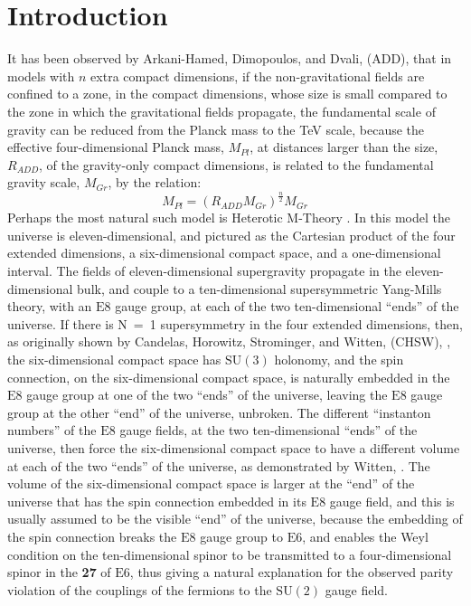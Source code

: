 \documentclass[a4paper,12pt,oneside]{article}
\begin{document}
\vspace{3.7cm}

\section{Introduction}

It has been observed by Arkani-Hamed, Dimopoulos, and Dvali, (ADD), 
\cite{ADD1, ADD2} that in models with $n$ extra compact dimensions, 
if the
non-gravitational fields are confined to a zone, in the compact
dimensions, whose size is small compared to the zone in which the
gravitational fields propagate, the fundamental scale of gravity can
be reduced from the Planck mass to the TeV scale, because the 
effective four-dimensional Planck mass, $M_{Pl}$, at distances 
larger than the size, $R_{ADD}$, of the gravity-only compact 
dimensions, is 
related to the fundamental gravity scale, $M_{Gr}$, by the relation:
\begin{equation}\label{ADD equation}
M_{Pl} = (R_{ADD}M_{Gr})^{\frac{n}{2}}M_{Gr}
\end{equation}
Perhaps the most natural such model is Heterotic M-Theory \cite{HW1,
HW2}.  In this model the universe is eleven-dimensional, and 
pictured as
the Cartesian product of the four extended dimensions, a
six-dimensional compact space, and a one-dimensional interval.  The
fields of eleven-dimensional supergravity propagate in the
eleven-dimensional bulk, and couple to a ten-dimensional
supersymmetric Yang-Mills theory, with an $\mathrm{E}8$ gauge group,
at each of the two ten-dimensional ``ends'' of the universe.  If
there is \mbox{N = 1} supersymmetry in the four extended 
dimensions, then,
as originally shown by Candelas, Horowitz, Strominger, and Witten,
(CHSW), \cite{CHSW}, the six-dimensional compact space has 
$\mathrm{SU}(3)$ holonomy, and the spin connection, on the 
six-dimensional compact space, is naturally embedded in the 
$\mathrm{E}8$ gauge group at one of the two ``ends'' of the 
universe, leaving the $\mathrm{E}8$ gauge group at the other 
``end'' of the universe, unbroken.  The different ``instanton 
numbers'' of the $\mathrm{E}8$ gauge fields, at the two 
ten-dimensional ``ends'' of the universe, then force the 
six-dimensional compact space to have a different volume at each of 
the two ``ends'' of the universe, as demonstrated by Witten,
\cite{Witten}.  The volume of the six-dimensional compact space is 
larger at the ``end'' of the universe
that has the spin connection embedded in its $\mathrm{E}8$ gauge
field, and this is usually assumed to be the visible ``end'' of the
universe, because the embedding of the spin connection breaks the
$\mathrm{E}8$ gauge group to $\mathrm{E}6$, and enables the Weyl
condition on the ten-dimensional spinor to be transmitted to a
four-dimensional spinor in the \textbf{27} of $\mathrm{E}6$, thus
giving a natural explanation for the observed parity violation of
the couplings of the fermions to the $\mathrm{SU}(2)$ gauge field.  
\end{document}
